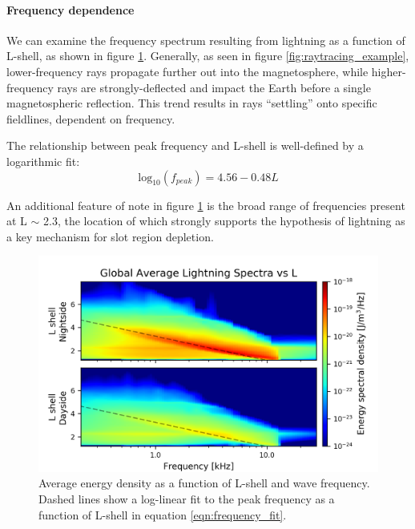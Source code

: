 \paragraph{Frequency dependence}
We can examine the frequency spectrum resulting from lightning as a function of L-shell, as shown in figure \ref{fig:energy_density_vs_L_vs_freq}. Generally, as seen in figure \ref{fig:raytracing_example}, lower-frequency rays propagate further out into the magnetosphere, while higher-frequency rays are strongly-deflected and impact the Earth before a single magnetospheric reflection. This trend results in rays ``settling'' onto specific fieldlines, dependent on frequency.

The relationship between peak frequency and L-shell is well-defined by a logarithmic fit:
\begin{equation}
\label{eqn:frequency_fit}
\mathrm{log}_{10}(f_{peak}) = 4.56 - 0.48 L
\end{equation}

An additional feature of note in figure \ref{fig:energy_density_vs_L_vs_freq} is the broad range of frequencies present at L $\sim$ 2.3, the location of which strongly supports the hypothesis of lightning as a key mechanism for slot region depletion. 
\begin{figure}[hb]
\begin{center}
\includegraphics{figures/lightning_spectra_vs_L_logscale.png}
\caption[Average energy density vs L and frequency]{Average energy density as a function of L-shell and wave frequency. Dashed lines show a log-linear fit to the peak frequency as a function of L-shell in equation \eqref{eqn:frequency_fit}.}
\label{fig:energy_density_vs_L_vs_freq}
\end{center}
\end{figure}

